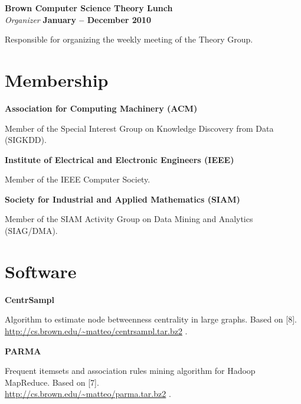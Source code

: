 \documentclass[margin,line]{resume}
\begin{document}
{\bf Brown Computer Science Theory Lunch}\\
{\em Organizer} \hfill {\bf January -- December 2010 }

\begin{list2}
\vspace*{.05in}
\item Responsible for organizing the weekly meeting of the Theory Group.
\end{list2}

\section{\sc Membership}
{\bf Association for Computing Machinery (ACM)}
\begin{list2}
\vspace*{.05in}
\item Member of the Special Interest Group on Knowledge Discovery from Data (SIGKDD).
\end{list2}
{\bf Institute of Electrical and Electronic Engineers (IEEE)}
\begin{list2}
\vspace*{.05in}
\item Member of the IEEE Computer Society.
\end{list2}
{\bf Society for Industrial and Applied Mathematics (SIAM)}
\begin{list2}
\vspace*{.05in}
\item Member of the SIAM Activity Group on Data Mining and Analytics
  (SIAG/DMA).
\end{list2}

\section{\sc Software}

{\bf CentrSampl}
\begin{list2}
  \vspace*{.05in}
\item Algorithm to estimate node betweenness centrality in large graphs. Based
  on [8]. \\\url{http://cs.brown.edu/~matteo/centrsampl.tar.bz2} .
\end{list2}

{\bf PARMA}
\begin{list2}
  \vspace*{.05in}
\item Frequent itemsets and association rules mining algorithm for Hadoop MapReduce.
  Based on [7]. \\\url{http://cs.brown.edu/~matteo/parma.tar.bz2} .
\end{list2}
\end{document}
